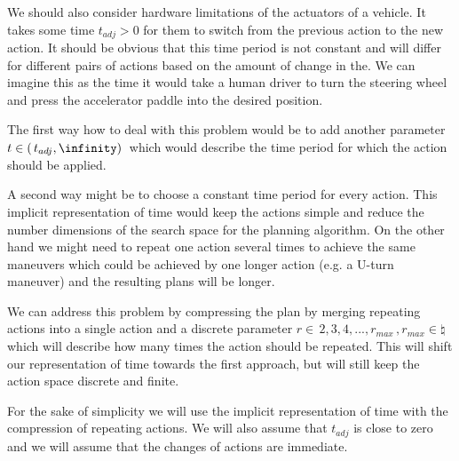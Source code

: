 We should also consider hardware limitations of the actuators of a vehicle. It takes some time $t_{adj} > 0$ for them to switch from the previous action to the new action. It should be obvious that this time period is not constant and will differ for different pairs of actions based on the amount of change in the. We can imagine this as the time it would take a human driver to turn the steering wheel and press the accelerator paddle into the desired position.

The first way how to deal with this problem would be to add another parameter $t \in ( \, t_{adj}, \infinity) \,$ which would describe the time period for which the action should be applied.

A second way might be to choose a constant time period for every action. This implicit representation of time would keep the actions simple and reduce the number dimensions of the search space for the planning algorithm. On the other hand we might need to repeat one action several times to achieve the same maneuvers which could be achieved by one longer action (e.g. a U-turn maneuver) and the resulting plans will be longer.

We can address this problem by compressing the plan by merging repeating actions into a single action and a discrete parameter $r \in { \, 2, 3, 4, ..., r_{max} } \,, r_{max} \in \natural$ which will describe how many times the action should be repeated. This will shift our representation of time towards the first approach, but will still keep the action space discrete and finite.

For the sake of simplicity we will use the implicit representation of time with the compression of repeating actions. We will also assume that $t_{adj}$ is close to zero and we will assume that the changes of actions are immediate.